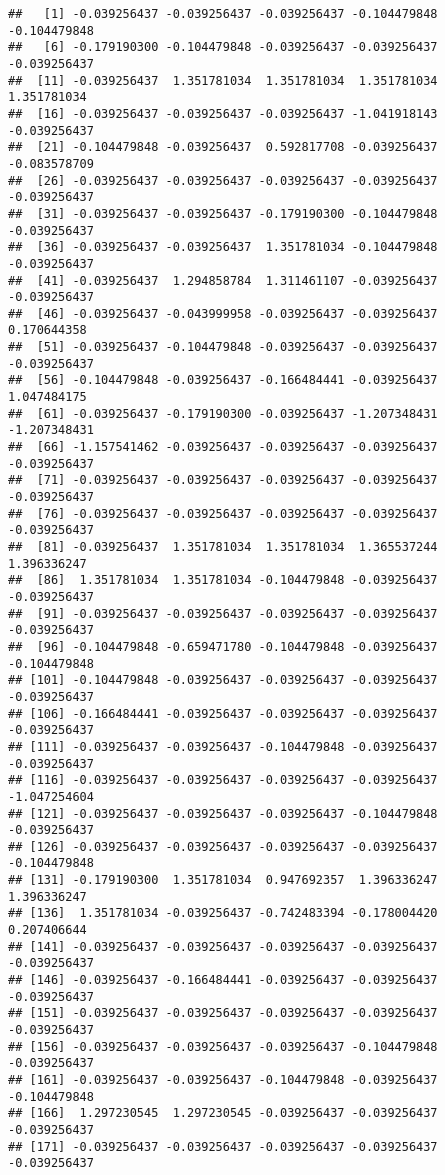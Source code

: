 \documentclass[
]{article}
\begin{document}
\begin{verbatim}
##   [1] -0.039256437 -0.039256437 -0.039256437 -0.104479848 -0.104479848
##   [6] -0.179190300 -0.104479848 -0.039256437 -0.039256437 -0.039256437
##  [11] -0.039256437  1.351781034  1.351781034  1.351781034  1.351781034
##  [16] -0.039256437 -0.039256437 -0.039256437 -1.041918143 -0.039256437
##  [21] -0.104479848 -0.039256437  0.592817708 -0.039256437 -0.083578709
##  [26] -0.039256437 -0.039256437 -0.039256437 -0.039256437 -0.039256437
##  [31] -0.039256437 -0.039256437 -0.179190300 -0.104479848 -0.039256437
##  [36] -0.039256437 -0.039256437  1.351781034 -0.104479848 -0.039256437
##  [41] -0.039256437  1.294858784  1.311461107 -0.039256437 -0.039256437
##  [46] -0.039256437 -0.043999958 -0.039256437 -0.039256437  0.170644358
##  [51] -0.039256437 -0.104479848 -0.039256437 -0.039256437 -0.039256437
##  [56] -0.104479848 -0.039256437 -0.166484441 -0.039256437  1.047484175
##  [61] -0.039256437 -0.179190300 -0.039256437 -1.207348431 -1.207348431
##  [66] -1.157541462 -0.039256437 -0.039256437 -0.039256437 -0.039256437
##  [71] -0.039256437 -0.039256437 -0.039256437 -0.039256437 -0.039256437
##  [76] -0.039256437 -0.039256437 -0.039256437 -0.039256437 -0.039256437
##  [81] -0.039256437  1.351781034  1.351781034  1.365537244  1.396336247
##  [86]  1.351781034  1.351781034 -0.104479848 -0.039256437 -0.039256437
##  [91] -0.039256437 -0.039256437 -0.039256437 -0.039256437 -0.039256437
##  [96] -0.104479848 -0.659471780 -0.104479848 -0.039256437 -0.104479848
## [101] -0.104479848 -0.039256437 -0.039256437 -0.039256437 -0.039256437
## [106] -0.166484441 -0.039256437 -0.039256437 -0.039256437 -0.039256437
## [111] -0.039256437 -0.039256437 -0.104479848 -0.039256437 -0.039256437
## [116] -0.039256437 -0.039256437 -0.039256437 -0.039256437 -1.047254604
## [121] -0.039256437 -0.039256437 -0.039256437 -0.104479848 -0.039256437
## [126] -0.039256437 -0.039256437 -0.039256437 -0.039256437 -0.104479848
## [131] -0.179190300  1.351781034  0.947692357  1.396336247  1.396336247
## [136]  1.351781034 -0.039256437 -0.742483394 -0.178004420  0.207406644
## [141] -0.039256437 -0.039256437 -0.039256437 -0.039256437 -0.039256437
## [146] -0.039256437 -0.166484441 -0.039256437 -0.039256437 -0.039256437
## [151] -0.039256437 -0.039256437 -0.039256437 -0.039256437 -0.039256437
## [156] -0.039256437 -0.039256437 -0.039256437 -0.104479848 -0.039256437
## [161] -0.039256437 -0.039256437 -0.104479848 -0.039256437 -0.104479848
## [166]  1.297230545  1.297230545 -0.039256437 -0.039256437 -0.039256437
## [171] -0.039256437 -0.039256437 -0.039256437 -0.039256437 -0.039256437

\end{verbatim}
\end{document}
